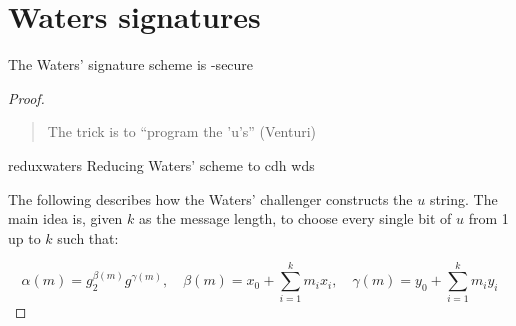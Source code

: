 \section{Waters signatures}
\begin{theorem}
    The Waters' signature scheme is \ufcma-secure
\end{theorem}

\begin{proof}
    \begin{quote}
        The trick is to ``program the 'u's'' (Venturi)
    \end{quote}



    \begin{cryptoredux}
        {reduxwaters}
        {Reducing Waters' scheme to \cdh}
        {cdh}
        {wds}

        \cseqdelay


        \cseqdelay

        
        \cseqdelay
        \cseqdelay

        
    \end{cryptoredux}


    The following describes how the Waters' challenger constructs the $u$ string. The main idea is, given $k$ as the message length, to choose every single bit of $u$ from 1 up to $k$ such that:

    \begin{equation*}
        \alpha(m) = g_2^{\beta(m)}g^{\gamma(m)},\quad \beta(m) = x_0 + \sum_{i=1}^{k}m_ix_i,\quad \gamma(m) = y_0 + \sum_{i=1}^{k}m_iy_i
    \end{equation*}


\end{proof}
